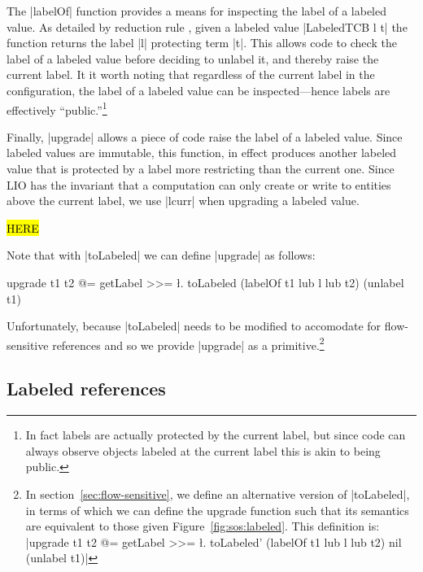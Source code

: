 The |labelOf| function provides a means for inspecting the label of a
labeled value.
%
As detailed by reduction rule , given a labeled value
|LabeledTCB l t| the function returns the label |l| protecting term
|t|.
%
This allows code to check the label of a labeled value before deciding
to unlabel it, and thereby raise the current label.
%
It it worth noting that regardless of the current label in the
configuration, the label of a labeled value can be inspected---hence
labels are effectively ``public.''\footnote{
In fact labels are actually protected by the current label, but since
code can always observe objects labeled at the current label this is
akin to being public.
}

Finally, |upgrade| allows a piece of code raise the label of a
labeled value.
%
Since labeled values are immutable, this function, in effect produces
another labeled value that is protected by a label more restricting
than the current one.
%
Since LIO has the invariant that a computation can only create or
write to entities above the current label, we use |lcurr| when
upgrading a labeled value.

\hl{HERE}


Note that with |toLabeled| we can define |upgrade| as follows:
\begin{code}
upgrade t1 t2 @= getLabel >>= \l.
  toLabeled (labelOf t1 lub l lub t2) (unlabel t1)
\end{code}
Unfortunately, because |toLabeled| needs to be modified to accomodate
for flow-sensitive references and so we provide |upgrade| as a
primitive.\footnote{
In section~\ref{sec:flow-sensitive}, we define an alternative
version of |toLabeled|, in terms of which we can define the
upgrade function such that its semantics are equivalent to those
given Figure~\ref{fig:sos:labeled}. This definition is:
|upgrade t1 t2 @= getLabel >>= \l.
  toLabeled' (labelOf t1 lub l lub t2) nil (unlabel t1)|
}

\subsection{Labeled references}

